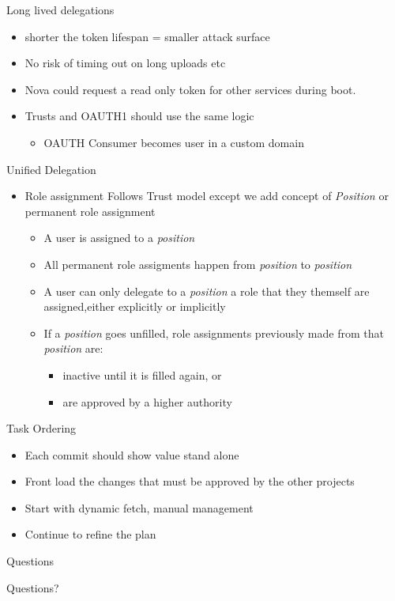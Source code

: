 \documentclass{beamer}
\begin{document}
\begin{frame}{Long lived delegations}
  \begin{itemize}
  \item shorter the token lifespan  = smaller attack surface
  \item No risk of timing out on long uploads etc
  \item Nova could request a read only token for other services during boot.
  \item Trusts and OAUTH1 should use the same logic
    \begin{itemize}
    \item OAUTH Consumer becomes user in a custom domain
    \end{itemize}
  \end{itemize}
\end{frame}


\begin{frame}{Unified Delegation}
  \begin{itemize}
  \item Role assignment Follows Trust model except we add concept of \textit{Position} or permanent role assignment
    \begin{itemize}
    \item A user is assigned to a \textit{position}
    \item All permanent role assigments happen from \textit{position} to \textit{position}
    \item A user can only delegate to a \textit{position} a role that they themself are assigned,either explicitly or implicitly
    \item If a \textit{position} goes unfilled, role assignments previously made from that \textit{position} are:
      \begin{itemize}
      \item inactive until it is filled again, or
      \item are approved by a higher authority
      \end{itemize}
    \end{itemize}
  \end{itemize}
\end{frame}

    

\begin{frame}{Task Ordering}
  \begin{itemize}
  \item Each commit should show value stand alone
  \item Front load the changes that must be approved by the other projects
  \item Start with dynamic fetch, manual management
  \item Continue to refine the plan
  \end{itemize}
\end{frame}



\begin{frame}{Questions}
  \begin{center}
    \begin{exampleblock}{}
      Questions?
    \end{exampleblock}
  \end{center}
\end{frame}
\end{document}
